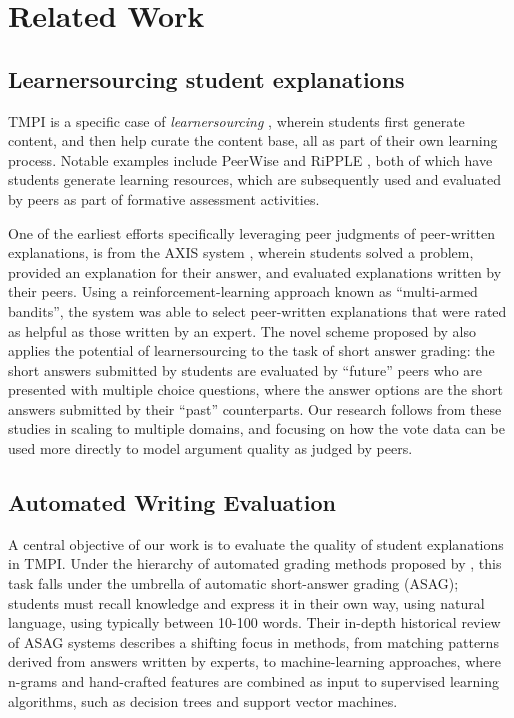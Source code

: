 \documentclass[notitlepage,12pt]{jedm}
\begin{document}
\section{Related Work}\label{sec:related_work}

\subsection{Learnersourcing student explanations}
TMPI is a specific case of  \textit{learnersourcing} 
\cite{weir_learnersourcing_2015}, wherein students first generate content, and 
then help curate the content base, all as part of their own learning process.
Notable examples include PeerWise \cite{denny_peerwise:_2008} and RiPPLE 
\cite{khosravi_ripple_2019}, both of which have students generate learning 
resources, which are subsequently used and evaluated by peers as part of 
formative assessment activities.

One of the earliest efforts specifically leveraging peer judgments of 
peer-written explanations, is from the AXIS system \cite{williams_axis:_2016}, 
wherein students solved a problem, provided an explanation for their answer, 
and evaluated explanations written by their peers.
Using a reinforcement-learning approach known as ``multi-armed bandits'', the 
system was able to select peer-written explanations that were rated as helpful 
as those written by an expert.
The novel scheme proposed by \cite{kolhe_peer_2016} also applies the potential 
of learnersourcing to the task of short answer grading: the short answers 
submitted by students are evaluated by ``future'' peers who are presented with 
multiple choice questions, where the answer options are the short answers 
submitted by their ``past'' counterparts.
Our research follows from these studies in scaling to multiple domains, and 
focusing on how the vote data can be used more directly to model argument 
quality as judged by peers.



\subsection{Automated Writing Evaluation}

A central objective of our work is to evaluate the quality of student 
explanations in TMPI.
Under the hierarchy of automated grading methods proposed by  
\cite{burrows_eras_2015}, this task falls under the umbrella of automatic 
short-answer grading (ASAG); students must recall knowledge and express it 
in their own way, using natural language, using typically between 10-100 words. 
Their in-depth historical review of ASAG systems describes a shifting focus in 
methods, from matching patterns derived from answers written by experts, to 
machine-learning approaches, where n-grams and hand-crafted features are 
combined as input to supervised learning algorithms, such as decision trees and 
support vector machines.
\end{document}
